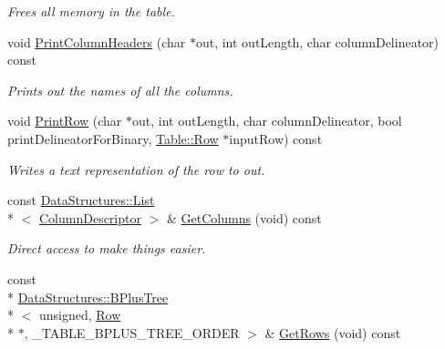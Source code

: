 \begin{DoxyCompactItemize}
\begin{DoxyCompactList}\small\item\em Frees all memory in the table. \end{DoxyCompactList}\item 
void \hyperlink{class_data_structures_1_1_table_ad5f587492c6580c62623dde2cead1bd7}{Print\-Column\-Headers} (char $\ast$out, int out\-Length, char column\-Delineator) const 
\begin{DoxyCompactList}\small\item\em Prints out the names of all the columns. \end{DoxyCompactList}\item 
void \hyperlink{class_data_structures_1_1_table_a83e4bccb2150bb954719fcccdeeea947}{Print\-Row} (char $\ast$out, int out\-Length, char column\-Delineator, bool print\-Delineator\-For\-Binary, \hyperlink{struct_data_structures_1_1_table_1_1_row}{Table\-::\-Row} $\ast$input\-Row) const 
\begin{DoxyCompactList}\small\item\em Writes a text representation of the row to {\itshape out}. \end{DoxyCompactList}\item 
\hypertarget{class_data_structures_1_1_table_afed108893d6386de885d6851fdf9ec64}{const \hyperlink{class_data_structures_1_1_list}{Data\-Structures\-::\-List}\\*
$<$ \hyperlink{struct_data_structures_1_1_table_1_1_column_descriptor}{Column\-Descriptor} $>$ \& \hyperlink{class_data_structures_1_1_table_afed108893d6386de885d6851fdf9ec64}{Get\-Columns} (void) const }\label{class_data_structures_1_1_table_afed108893d6386de885d6851fdf9ec64}

\begin{DoxyCompactList}\small\item\em Direct access to make things easier. \end{DoxyCompactList}\item 
\hypertarget{class_data_structures_1_1_table_af80dba550b9df6ec50e242bec0edcd04}{const \\*
\hyperlink{class_data_structures_1_1_b_plus_tree}{Data\-Structures\-::\-B\-Plus\-Tree}\\*
$<$ unsigned, \hyperlink{struct_data_structures_1_1_table_1_1_row}{Row} \\*
$\ast$, \-\_\-\-T\-A\-B\-L\-E\-\_\-\-B\-P\-L\-U\-S\-\_\-\-T\-R\-E\-E\-\_\-\-O\-R\-D\-E\-R $>$ \& \hyperlink{class_data_structures_1_1_table_af80dba550b9df6ec50e242bec0edcd04}{Get\-Rows} (void) const }\label{class_data_structures_1_1_table_af80dba550b9df6ec50e242bec0edcd04}


\end{DoxyCompactItemize}
